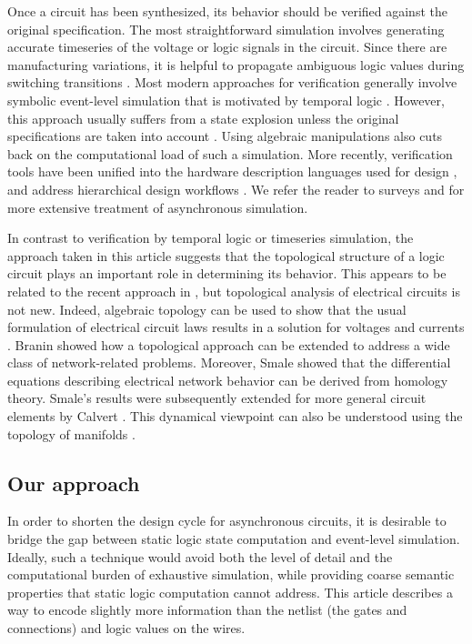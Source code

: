 \documentclass{amsart}
\theoremstyle{plain}
\theoremstyle{definition}
\begin{document}
Once a circuit has been synthesized, its behavior should be verified
against the original specification.  The most straightforward
simulation involves generating accurate timeseries of the
voltage or logic signals in the circuit.  Since there are manufacturing
variations, it is helpful to propagate ambiguous logic values during
switching transitions \cite{Chappell_1971}.  Most modern approaches
for verification generally involve symbolic event-level
simulation that is motivated by temporal logic \cite{Browne_1986}.
However, this approach usually suffers from a state explosion unless
the original specifications are taken into account
\cite{Clarke_1987}.  Using algebraic manipulations \cite{Ishiura_1989}
also cuts back on the computational load of such a simulation.  More
recently, verification tools have been unified into the hardware
description languages used for design \cite{Endecott_1998}, and
address hierarchical design workflows \cite{Vakilotojar_2000}.  We
refer the reader to surveys \cite{Meister_1993} and \cite{Baker_1994}
for more extensive treatment of asynchronous simulation.

In contrast to verification by temporal logic or timeseries
simulation, the approach taken in this article suggests that the
topological structure of a logic circuit plays an important role in
determining its behavior.  This appears to be related to the recent
approach in \cite{Meredith_2007}, but topological analysis of
electrical circuits is not new.  Indeed, algebraic topology can be
used to show that the usual formulation of electrical circuit laws
results in a solution for voltages and currents \cite{Roth_1955}.
Branin \cite{Branin_1966} showed how a topological approach can be
extended to address a wide class of network-related problems.
Moreover, Smale \cite{Smale_1972} showed that the differential
equations describing electrical network behavior can be derived from
homology theory.  Smale's results were subsequently extended for more
general circuit elements by Calvert \cite{Calvert_1997}.  This
dynamical viewpoint can also be understood using the topology of
manifolds \cite{Matsumato_1976}.

\subsection{Our approach}

In order to shorten the design cycle for asynchronous circuits, it is desirable to bridge the gap between static logic state computation and event-level simulation.  Ideally, such a technique would avoid both the level of detail and the computational burden of exhaustive simulation, while providing coarse semantic properties that static logic computation cannot address.  This article describes a way to encode slightly more information than the netlist (the gates and connections) and logic values on the wires.  
\end{document}
